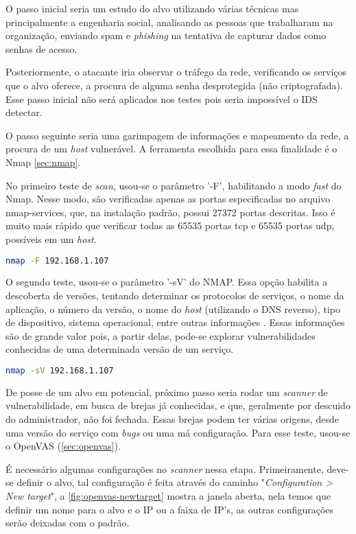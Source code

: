 O passo inicial seria um estudo do alvo utilizando várias técnicas mas principalmente a engenharia social, analisando as pessoas que trabalharam na organização, enviando spam e \textit{phishing} na tentativa de capturar dados como senhas de acesso. 

Posteriormente, o atacante iria observar o tráfego da rede, verificando os serviços que o alvo oferece, a procura de alguma senha desprotegida (não criptografada). Esse passo inicial não será aplicados nos testes pois seria impossível o IDS detectar.

O passo seguinte seria uma garimpagem de informações e mapeamento da rede, a procura de um \textit{host} vulnerável. A ferramenta escolhida para essa finalidade é o Nmap \autoref{sec:nmap}. 

No primeiro teste de \textit{scan}, usou-se o parâmetro '-F', habilitando a modo \textit{fast} do Nmap. Nesse modo, são verificadas apenas as portas especificadas no arquivo nmap-services, que, na instalação padrão, possui 27372 portas descritas. Isso é muito mais rápido que verificar todas as 65535 portas tcp e 65535 portas udp, possíveis em um \textit{host}.

\begin{lstlisting}[language=bash, frame=single]
    nmap -F 192.168.1.107
\end{lstlisting}

O segundo teste, usou-se o parâmetro '-sV' do NMAP. Essa opção habilita a descoberta de versões, tentando determinar os protocolos de serviços, o nome da aplicação, o número da versão, o nome do \textit{host} (utilizando o DNS reverso), tipo de dispositivo, sistema operacional, entre outras informações \cite{nmap}. Essas informações são de grande valor pois, a partir delas, pode-se explorar vulnerabilidades conhecidas de uma determinada versão de um serviço.

\begin{lstlisting}[language=bash, frame=single]  
    nmap -sV 192.168.1.107
\end{lstlisting}

De posse de um alvo em potencial, próximo passo seria rodar um \textit{scanner} de vulnerabilidade, em busca de brejas já conhecidas, e que, geralmente por descuido do administrador, não foi fechada. Essas brejas podem ter várias origens, desde uma versão do serviço com \textit{bugs} ou uma má configuração. Para esse teste, usou-se o OpenVAS (\autoref{sec:openvas}).

É necessário algumas configurações no \textit{scanner} nessa etapa. Primeiramente, deve-se definir o alvo, tal configuração é feita através do caminho "\textit{Configuration > New target}", a \autoref{fig:openvas-newtarget} mostra a janela aberta, nela temos que definir um nome para o alvo e o IP ou a faixa de IP's, as outras configurações serão deixadas com o padrão.

